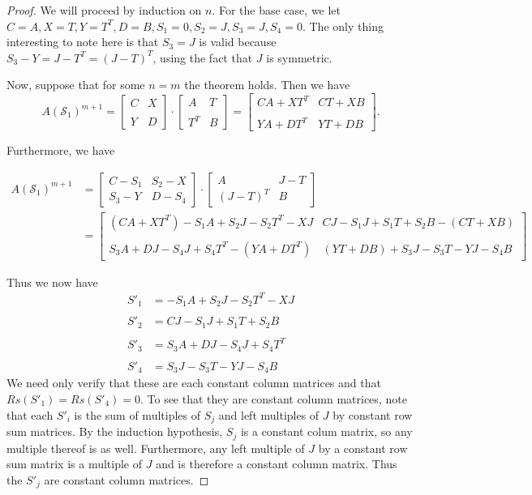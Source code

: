 \begin{proof} We will proceed by induction on $n$. For the base case, we let $C = A, X = T, Y = T^T, D = B, S_1 = 0, S_2 = J, S_3 = J, S_4 = 0$. The only thing interesting to note here is that $S_3 = J$ is valid because $S_3 - Y = J - T^T = (J - T)^T$, using the fact that $J$ is symmetric.

Now, suppose that for some $n = m$ the theorem holds. Then we have
$$
A(\mathcal{S}_1)^{m+1} = \begin{bmatrix}
    C & X \\\\
    Y & D
\end{bmatrix} \cdot \begin{bmatrix}
    A & T \\\\
    T^T & B
\end{bmatrix} = \begin{bmatrix}
    CA + XT^T & CT + XB \\\\
    YA + DT^T & YT + DB
\end{bmatrix}.
$$

Furthermore, we have

\begin{align*}
  A(\mathcal{S}_1)^{m+1} &= \begin{bmatrix}
      C - S_1 & S_2 - X \\
      S_3 - Y & D - S_4
  \end{bmatrix} \cdot \begin{bmatrix}
      A & J - T \\
      (J - T)^T & B
  \end{bmatrix} \\ &= \begin{bmatrix}
      (CA + XT^T) - S_1 A + S_2 J - S_2 T^T - X J & CJ - S_1 J + S_1 T + S_2 B - (CT + XB) \\\\
      S_3 A + DJ - S_4 J + S_4 T^T - (YA + DT^T) & (YT + DB) + S_3 J - S_3 T - YJ - S_4 B
  \end{bmatrix}
\end{align*}

Thus we now have
\begin{align*}
S'_1 &= - S_1 A + S_2 J - S_2 T^T - X J \\\\
S'_2 &= CJ - S_1 J + S_1 T + S_2 B \\\\
S'_3 &= S_3 A + DJ - S_4 J + S_4 T^T \\\\
S'_4 &= S_3 J - S_3 T - YJ - S_4 B
\end{align*}
We need only verify that these are each constant column matrices and that $Rs(S'_1) = Rs(S'_4) = 0$. To see that they are constant column matrices, note that each $S'_i$ is the sum of multiples of $S_j$ and left multiples of $J$ by constant row sum matrices. By the induction hypothesis, $S_j$ is a constant colum matrix, so any multiple thereof is as well. Furthermore, any left multiple of $J$ by a constant row sum matrix is a multiple of $J$ and is therefore a constant column matrix. Thus the $S'_j$ are constant column matrices. 


\end{proof}
